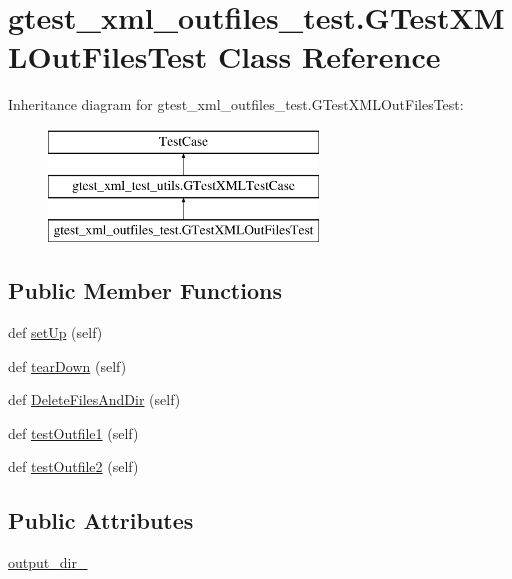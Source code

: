 \hypertarget{classgtest__xml__outfiles__test_1_1_g_test_x_m_l_out_files_test}{}\section{gtest\+\_\+xml\+\_\+outfiles\+\_\+test.\+G\+Test\+X\+M\+L\+Out\+Files\+Test Class Reference}
\label{classgtest__xml__outfiles__test_1_1_g_test_x_m_l_out_files_test}
Inheritance diagram for gtest\+\_\+xml\+\_\+outfiles\+\_\+test.\+G\+Test\+X\+M\+L\+Out\+Files\+Test\+:\begin{figure}[H]
\begin{center}
\leavevmode
\includegraphics[height=3.000000cm]{d0/d8d/classgtest__xml__outfiles__test_1_1_g_test_x_m_l_out_files_test}
\end{center}
\end{figure}
\subsection*{Public Member Functions}
\begin{DoxyCompactItemize}
\item 
def \mbox{\hyperlink{classgtest__xml__outfiles__test_1_1_g_test_x_m_l_out_files_test_a56550f293277d18c36e868a637fe1153}{set\+Up}} (self)
\item 
def \mbox{\hyperlink{classgtest__xml__outfiles__test_1_1_g_test_x_m_l_out_files_test_a49d1d410370ba8a3cfcc281eaadb5706}{tear\+Down}} (self)
\item 
def \mbox{\hyperlink{classgtest__xml__outfiles__test_1_1_g_test_x_m_l_out_files_test_a503d2fbc9cd782ae57ac4307d2db43e1}{Delete\+Files\+And\+Dir}} (self)
\item 
def \mbox{\hyperlink{classgtest__xml__outfiles__test_1_1_g_test_x_m_l_out_files_test_a034738bbc00ac46d00f183402c561228}{test\+Outfile1}} (self)
\item 
def \mbox{\hyperlink{classgtest__xml__outfiles__test_1_1_g_test_x_m_l_out_files_test_a3c02687f092a482d0d0260c7ed94c618}{test\+Outfile2}} (self)
\end{DoxyCompactItemize}
\subsection*{Public Attributes}
\begin{DoxyCompactItemize}
\item 
\mbox{\hyperlink{classgtest__xml__outfiles__test_1_1_g_test_x_m_l_out_files_test_aa5c31cd97047bc1d3060f4d27bc956a4}{output\+\_\+dir\+\_\+}}
\end{DoxyCompactItemize}
